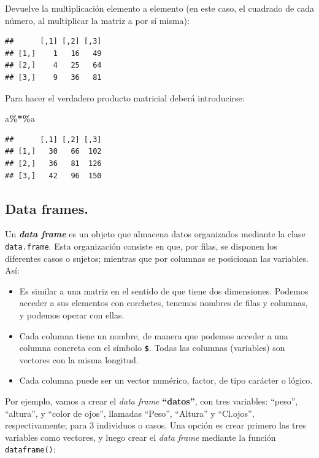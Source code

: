 \documentclass[
]{book}
\newenvironment{Shaded}{\begin{snugshade}}{\end{snugshade}}
\newcommand{\NormalTok}[1]{#1}
\newcommand{\SpecialCharTok}[1]{\textcolor[rgb]{0.81,0.36,0.00}{\textbf{#1}}}
\begin{document}
Devuelve la multiplicación elemento a elemento (en este caso, el cuadrado de cada número, al multiplicar la matriz a por sí misma):

\begin{verbatim}
##      [,1] [,2] [,3]
## [1,]    1   16   49
## [2,]    4   25   64
## [3,]    9   36   81
\end{verbatim}

Para hacer el verdadero producto matricial deberá introducirse:

\begin{Shaded}
\begin{Highlighting}[]
\NormalTok{a}\SpecialCharTok{\%*\%}\NormalTok{a}
\end{Highlighting}
\end{Shaded}

\begin{verbatim}
##      [,1] [,2] [,3]
## [1,]   30   66  102
## [2,]   36   81  126
## [3,]   42   96  150
\end{verbatim}

\subsection{Data frames.}\label{data-frames.}

Un \textbf{\emph{data frame}} es un objeto que almacena datos organizados mediante la clase \texttt{data.frame}. Esta organización consiste en que, por filas, se disponen los diferentes casos o sujetos; mientras que por columnas se posicionan las variables. Así:

\begin{itemize}
\item
  Es similar a una matriz en el sentido de que tiene dos dimensiones. Podemos acceder a sus elementos con corchetes, tenemos nombres de filas y columnas, y podemos operar con ellas.
\item
  Cada columna tiene un nombre, de manera que podemos acceder a una columna concreta con el símbolo \textbf{\texttt{\$}}. Todas las columnas (variables) son vectores con la misma longitud.
\item
  Cada columna puede ser un vector numérico, factor, de tipo carácter o lógico.
\end{itemize}

Por ejemplo, vamos a crear el \emph{data frame} \textbf{``datos''}, con tres variables: ``peso'', ``altura'', y ``color de ojos'', llamadas ``Peso'', ``Altura'' y ``Cl.ojos'', respectivamente; para 3 individuos o casos. Una opción es crear primero las tres variables como vectores, y luego crear el \emph{data frame} mediante la función \texttt{dataframe()}:
\end{document}
